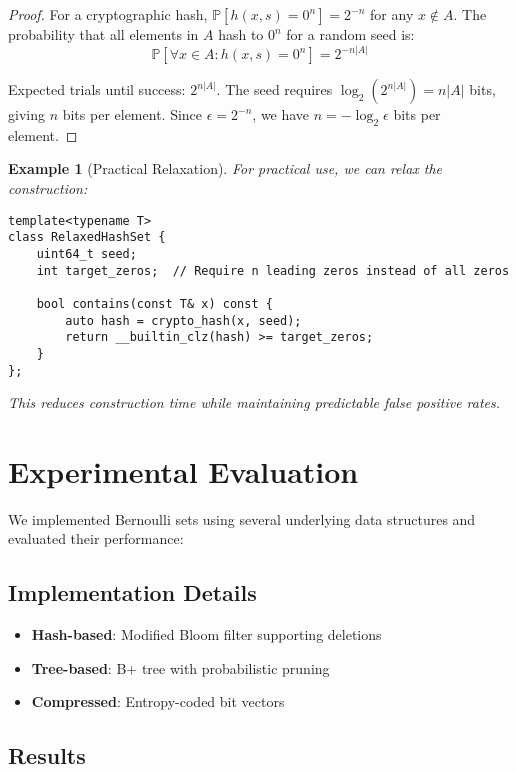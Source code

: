 \documentclass[11pt,final,hidelinks]{article}
\newtheorem{example}[theorem]{Example}
\newcommand{\Prob}[1]{\mathbb{P}\left[#1\right]}
\begin{document}
\begin{proof}
For a cryptographic hash, $\Prob{h(x,s) = 0^n} = 2^{-n}$ for any $x \notin A$. The probability that all elements in $A$ hash to $0^n$ for a random seed is:
\begin{equation}
\Prob{\forall x \in A: h(x,s) = 0^n} = 2^{-n|A|}
\end{equation}

Expected trials until success: $2^{n|A|}$. The seed requires $\log_2(2^{n|A|}) = n|A|$ bits, giving $n$ bits per element. Since $\epsilon = 2^{-n}$, we have $n = -\log_2 \epsilon$ bits per element.
\end{proof}

\begin{example}[Practical Relaxation]
For practical use, we can relax the construction:
\begin{verbatim}
template<typename T>
class RelaxedHashSet {
    uint64_t seed;
    int target_zeros;  // Require n leading zeros instead of all zeros
    
    bool contains(const T& x) const {
        auto hash = crypto_hash(x, seed);
        return __builtin_clz(hash) >= target_zeros;
    }
};
\end{verbatim}
This reduces construction time while maintaining predictable false positive rates.
\end{example}

\section{Experimental Evaluation}

We implemented Bernoulli sets using several underlying data structures and evaluated their performance:

\subsection{Implementation Details}

\begin{itemize}
    \item \textbf{Hash-based}: Modified Bloom filter supporting deletions
    \item \textbf{Tree-based}: B+ tree with probabilistic pruning
    \item \textbf{Compressed}: Entropy-coded bit vectors
\end{itemize}

\subsection{Results}
\end{document}
